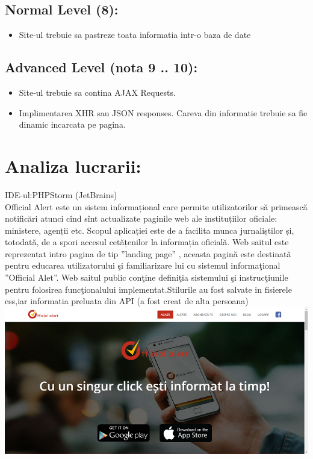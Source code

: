 \documentclass[12pt]{article}
\begin{document}
\subsection{Normal Level (8):}
\begin{itemize}
\item Site-ul trebuie sa pastreze toata informatia intr-o baza de date
\end{itemize}
\subsection{Advanced Level (nota 9 .. 10):}
\begin{itemize}
\item Site-ul trebuie sa contina AJAX Requests.
\item Implimentarea XHR sau JSON responses. Careva din informatie trebuie sa fie dinamic incarcata pe pagina.
\end{itemize}
\section{Analiza lucrarii:}
IDE-ul:PHPStorm (JetBrains)\\
Official Alert este un sistem informațional care permite utilizatorilor să primească notificări atunci cînd sînt actualizate paginile web ale instituțiilor oficiale: ministere, agenții etc.
Scopul aplicației este de a facilita munca jurnaliștilor și, totodată, de a spori accesul cetățenilor la informația oficială.
 Web saitul este reprezentat intro pagina de tip ”landing page” , aceasta pagină este destinată pentru educarea utilizatorului şi familiarizare lui cu sistemul informaţional ”Official Alet”. Web saitul public conţine definiţia sistemului şi instrucţiunile pentru folosirea funcţionalului implementat.Stilurile au fost salvate in fisierele css,iar informatia preluata din API (a fost creat de alta persoana)\\
 \includegraphics{header.png}\\
 
\end{document}
